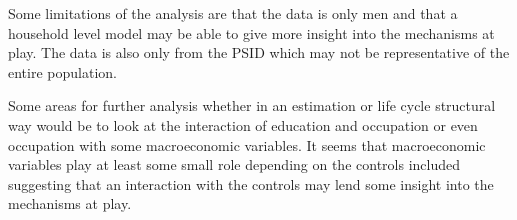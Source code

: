 \documentclass[12pt]{article}
\begin{document}
\begin{onehalfspace}
Some limitations of the analysis are that the data is only men and that a household level model may be able to give more insight into the mechanisms at play. The data is also only from the PSID which may not be representative of the entire population. 

Some areas for further analysis whether in an estimation or life cycle structural way would be to look at the interaction of education and occupation or even occupation with some macroeconomic variables. It seems that macroeconomic variables play at least some small role depending on the controls included suggesting that an interaction with the controls may lend some insight into the mechanisms at play.

\end{onehalfspace}
\end{document}
